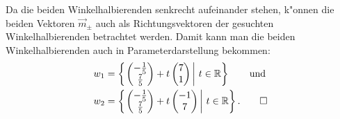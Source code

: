 \begin{loesung}
Da die
beiden Winkelhalbierenden senkrecht aufeinander stehen, k"onnen die beiden
Vektoren $\vec m_{\pm}$ auch als Richtungsvektoren der gesuchten Winkelhalbierenden
betrachtet werden. Damit kann man die beiden Winkelhalbierenden auch in
Parameterdarstellung bekommen:
\begin{align*}
w_1&=\left\{
\left.
\begin{pmatrix}-\frac15\\\frac75\end{pmatrix}+t\begin{pmatrix}7\\1\end{pmatrix}
\,
\right|\,t\in\mathbb R
\right\}\qquad\text{und}
\\
w_2&=\left\{
\left.
\begin{pmatrix}-\frac15\\\frac75\end{pmatrix}+t\begin{pmatrix}-1\\7\end{pmatrix}
\,
\right|\,t\in\mathbb R
\right\}.
\qedhere
\end{align*}
\end{loesung}

